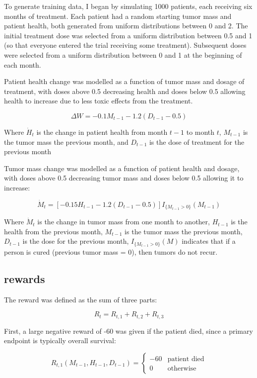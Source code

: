 \documentclass[12pt]{article}
\begin{document}
To generate training data, I began by simulating 1000 patients, each receiving six months of treatment. Each patient had a random starting tumor mass and patient health, both generated from uniform distributions between 0 and 2. The initial treatment dose was selected from a uniform distribution between 0.5 and 1 (so that everyone entered the trial receiving some treatment). Subsequent doses were selected from a uniform distribution between 0 and 1 at the beginning of each month.

Patient health change was modelled as a function of tumor mass and dosage of treatment, with doses above 0.5 decreasing health and doses below 0.5 allowing health to increase due to less toxic effects from the treatment.

\[
\Delta W = - 0.1 M_{t-1} - 1.2 (D_{t-1} - 0.5)
\]

Where $\dot{H}_{t}$ is the change in patient health from month $t-1$ to month $t$, 
$M_{t-1}$ is the tumor mass the previous month, and 
$D_{t-1}$ is the dose of treatment for the previous month

Tumor mass change was modelled as a function of patient health and dosage, with doses above 0.5 decreasing tumor mass and doses below 0.5 allowing it to increase:

\[
\dot{M}_{t} = [- 0.15 H_{t-1} - 1.2 (D_{t-1} - 0.5)] I_{\{M_{t-1} > 0\}}(M_{t-1})
\]

Where $\dot{M}_{t}$ is the change in tumor mass from one month to another,
$H_{t-1}$ is the health from the previous month,
$M_{t-1}$ is the tumor mass the previous month,
$D_{t-1}$ is the dose for the previous month,
$I_{\{M_{t-1} > 0\}}(M)$ indicates that if a person is cured (previous tumor mass = 0), then tumors do not recur.



\subsection{rewards} %
\label{sub:}

The reward was defined as the sum of three parts: 

\[
R_{t} = R_{t, 1} + R_{t, 2} + R_{t, 3}
\]

First, a large negative reward of -60 was given if the patient died, since a primary endpoint is typically overall survival:

\[
R_{t, 1}(M_{t-1}, H_{t-1}, D_{t-1}) = 
\begin{cases}
  -60 & \text{patient died} \\
  0 & \text{otherwise}
\end{cases}
\]
\end{document}
